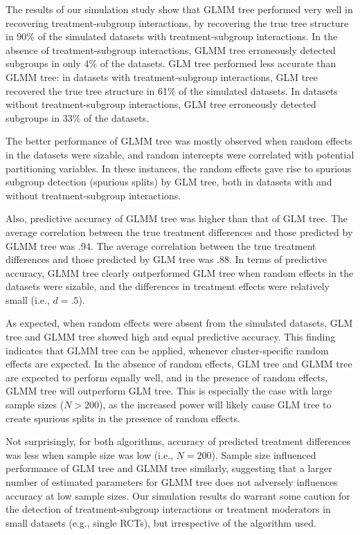 \documentclass[nobf,doc]{apa}
\begin{document}
The results of our simulation study show that GLMM tree performed very well in recovering treatment-subgroup interactions, by recovering the true tree structure in 90\% of the simulated datasets with treatment-subgroup interactions. In the absence of treatment-subgroup interactions, GLMM tree erroneously detected subgroups in only 4\% of the datasets. GLM tree performed less accurate than GLMM tree: in datasets with treatment-subgroup interactions, GLM tree recovered the true tree structure in 61\% of the simulated datasets. In datasets without treatment-subgroup interactions, GLM tree erroneously detected subgroups in 33\% of the datasets. 

The better performance of GLMM tree was mostly observed when random effects in the datasets were sizable, and random intercepts were correlated with potential partitioning variables. In these instances, the random effects gave rise to spurious subgroup detection (spurious splits) by GLM tree, both in datasets with and without treatment-subgroup interactions. 

Also, predictive accuracy of GLMM tree was higher than that of GLM tree. The average correlation between the true treatment differences and those predicted by GLMM tree was .94.  The average correlation between the true treatment differences and those predicted by GLM tree was .88. In terms of predictive accuracy, GLMM tree clearly outperformed GLM tree when random effects in the datasets were sizable, and the differences in treatment effects were relatively small (i.e., $d=.5$).

As expected, when random effects were absent from the simulated datasets, GLM tree and GLMM tree showed high and equal predictive accuracy. This finding indicates that GLMM tree can be applied, whenever cluster-specific random effects are expected. In the absence of random effects, GLM tree and GLMM tree are expected to perform equally well, and in the presence of random effects, GLMM tree will outperform GLM tree. This is especially the case with large sample sizes ($N > 200$), as the increased power will likely cause GLM tree to create spurious splits in the presence of random effects. 

Not surprisingly, for both algorithms, accuracy of predicted treatment differences was less when sample size was low (i.e., $N=200$). Sample size influenced performance of GLM tree and GLMM tree similarly, suggesting that a larger number of estimated parameters for GLMM tree does not adversely influences accuracy at low sample sizes. Our simulation results do warrant some caution for the detection of treatment-subgroup interactions or treatment moderators in small datasets (e.g., single RCTs), but irrespective of the algorithm used. 
\end{document}
